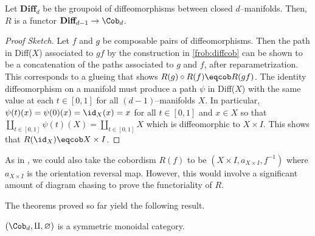 \begin{cor}\label{disjunion:cylinderconst}
Let $\textbf{Diff}_d$ be the groupoid of diffeomorphisms between closed
$d$--manifolds. Then, $R$ is a functor $\textbf{Diff}_{d - 1} \to \Cob_d$.
\end{cor}
\begin{proof}[Proof Sketch]
Let $f$ and $g$ be composable pairs of diffeomorphisms. Then the path in
Diff($X$) associated to $gf$ by the construction in \ref{frob:diffcob} can be
shown to be a concatenation of the paths associated to $g$ and $f$, after
reparametrization. This corresponds to a glueing that shows
$R(g) \circ R(f) \eqcob R(gf)$. The identity diffeomorphism on a manifold must
produce a path $\psi$ in Diff($X$) with the same value at each $t \in [0, 1]$
for all $(d - 1)$--manifolds $X$. In particular, $\psi(t)(x) = \psi(0)(x) =
\id_X(x) = x$ for all $t \in [0, 1]$ and $x \in X$ so that
$\coprod_{t \in [0, 1]} \psi(t)(X) = \coprod_{t \in [0, 1]} X$ which is
diffeomorphic to $X \times I$. This shows that $R(\id_X) \eqcob X \times I$.
\end{proof}

\begin{rmk}
As in \cite{Jorge}, we could also take the cobordism $R(f)$ to be
$(X \times I, a_{X \times I}, f^{-1})$ where $a_{X \times I}$ is the orientation
reversal map. However, this would involve a significant amount of diagram
chasing to prove the functoriality of $R$.
\end{rmk}

The theorems proved so far yield the following result.
\begin{thm}
$(\Cob_d, \amalg, \varnothing)$ is a symmetric monoidal category.
\end{thm}

